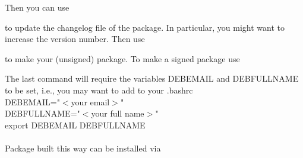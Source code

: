Then you can use 



to update the changelog file of the package. In particular, you might want to
increase the version number. Then use


to make your (unsigned) package. To make a signed package use


The last command will require the variables DEBEMAIL and DEBFULLNAME to be set, i.e., you may want to add to your .bashrc\\
DEBEMAIL="$<$your email$>$"\\
DEBFULLNAME="$<$your full name$>$"\\
export DEBEMAIL DEBFULLNAME\\
\\
Package built this way can be installed via 
 

